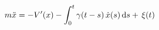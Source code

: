 \documentclass[preview]{standalone}
\begin{document}
\begin{align*}
\special{dvisvgm:raw <g id='unique000'>}m\ddot x=-V'(x)- \special{dvisvgm:raw </g>}\special{dvisvgm:raw <g id='unique001'>}\int_0^t\gamma(t-s)\,\dot x(s)\,\mathrm{d}s \special{dvisvgm:raw </g>}\special{dvisvgm:raw <g id='unique002'>}+\,\xi(t)\special{dvisvgm:raw </g>}
\end{align*}
\end{document}
